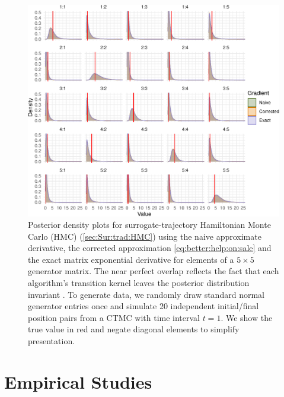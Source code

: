 \documentclass[9pt,twocolumn,twoside]{pnas-new}
\newcommand{\?}{\textbf{?}}
\begin{document}
\begin{figure}[!t]
	\centering
	\includegraphics[width=\linewidth]{lowDimVis.pdf}
	\vspace{-2em}
	\caption{Posterior density plots for surrogate-trajectory Hamiltonian Monte Carlo (HMC) (\cref{sec:Sur:trad:HMC}) using the naive approximate derivative, the corrected approximation \eqref{eq:better:help:on:sale} and the exact matrix exponential derivative for elements of a $5\times 5$ generator matrix. The near perfect overlap reflects the fact that each algorithm's transition kernel leaves the posterior distribution invariant \cite{glatt2020accept}.  To generate data, we randomly draw standard normal generator entries once and simulate 20 independent initial/final position pairs from a CTMC with time interval $t=1$.  We show the true value in red and negate diagonal elements to simplify presentation.  }\label{fig:lowDim}
\end{figure}

\section{Empirical Studies}
\end{document}
